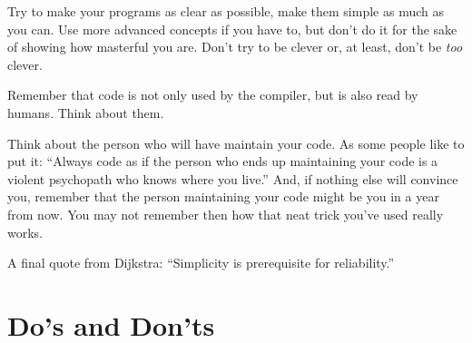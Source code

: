 Try to make your programs as clear as possible, make them 
simple as much as you can. Use more advanced concepts if 
you have to, but don't do it for the sake of showing how 
masterful you are. Don't try to be clever or, at least, 
don't be \emph{too} clever.

Remember that code is not only used by the compiler, but 
is also read by humans. Think about them.

Think about the person who will have maintain your code. 
As some people like to put it: ``Always code as if the person 
who ends up maintaining your code is a violent psychopath 
who knows where you live.'' And, if nothing else will convince 
you, remember that the person maintaining your code might be 
you in a year from now. You may not remember then 
how that neat trick you've used really works.

A final quote from Dijkstra: ``Simplicity is prerequisite 
for reliability.''

\section{Do's and Don'ts}

